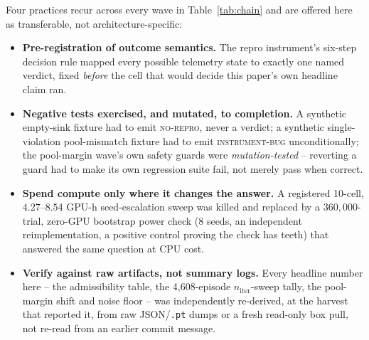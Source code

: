 \documentclass[10pt,letterpaper]{article}
\newcommand{\niter}{n_{\mathrm{iter}}}
\begin{document}
Four practices recur across every wave in Table~\ref{tab:chain} and are
offered here as transferable, not architecture-specific:

\begin{itemize}
  \item \textbf{Pre-registration of outcome semantics.} The repro
    instrument's six-step decision rule mapped every possible telemetry
    state to exactly one named verdict, fixed \emph{before} the cell that
    would decide this paper's own headline claim ran.
  \item \textbf{Negative tests exercised, and mutated, to completion.} A
    synthetic empty-sink fixture had to emit \textsc{no-repro}, never a
    verdict; a synthetic single-violation pool-mismatch fixture had to
    emit \textsc{instrument-bug} unconditionally; the pool-margin wave's
    own safety guards were \emph{mutation-tested} -- reverting a guard had
    to make its own regression suite fail, not merely pass when correct.
  \item \textbf{Spend compute only where it changes the answer.} A
    registered 10-cell, $4.27$--$8.54$ GPU-h seed-escalation sweep was
    killed and replaced by a $360{,}000$-trial, zero-GPU bootstrap power
    check (8 seeds, an independent reimplementation, a positive control
    proving the check has teeth) that answered the same question at CPU
    cost.
  \item \textbf{Verify against raw artifacts, not summary logs.} Every
    headline number here -- the admissibility table, the 4{,}608-episode
    $\niter$-sweep tally, the pool-margin shift and noise floor -- was
    independently re-derived, at the harvest that reported it, from raw
    JSON/\texttt{.pt} dumps or a fresh read-only box pull, not re-read
    from an earlier commit message.
\end{itemize}
\end{document}
